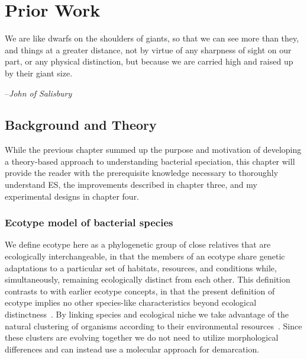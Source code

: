 \gobbletocpage
\chapter{Prior Work}
\restoretocpage


\begin{shadequote}
We are like dwarfs on the shoulders of giants, so that we can see more than they, and things at a greater distance, not by virtue of any sharpness of sight on our part, or any physical distinction, but because we are carried high and raised up by their giant size.\par--\emph{John of Salisbury}
\end{shadequote}

\section{Background and Theory}
While the previous chapter summed up the purpose and motivation of developing a theory-based approach to understanding bacterial speciation, this chapter will provide the reader with the prerequisite knowledge necessary to thoroughly understand ES, the improvements described in chapter three, and my experimental designs in chapter four.

\subsection*{Ecotype model of bacterial species}
We define ecotype here as a phylogenetic group of close relatives that are ecologically interchangeable, in that the members of an ecotype share genetic adaptations to a particular set of habitats, resources, and conditions while, simultaneously, remaining ecologically distinct from each other.
This definition contrasts to with earlier ecotype concepts, in that the present definition of ecotype implies no other species-like characteristics beyond ecological distinctness~\cite{wiedenbeckHGT}.
By linking species and ecological niche we take advantage of the natural clustering of organisms according to their environmental resources~\cite{darwin1861origin}.
Since these clusters are evolving together we do not need to utilize morphological differences and can instead use a molecular approach for demarcation.

